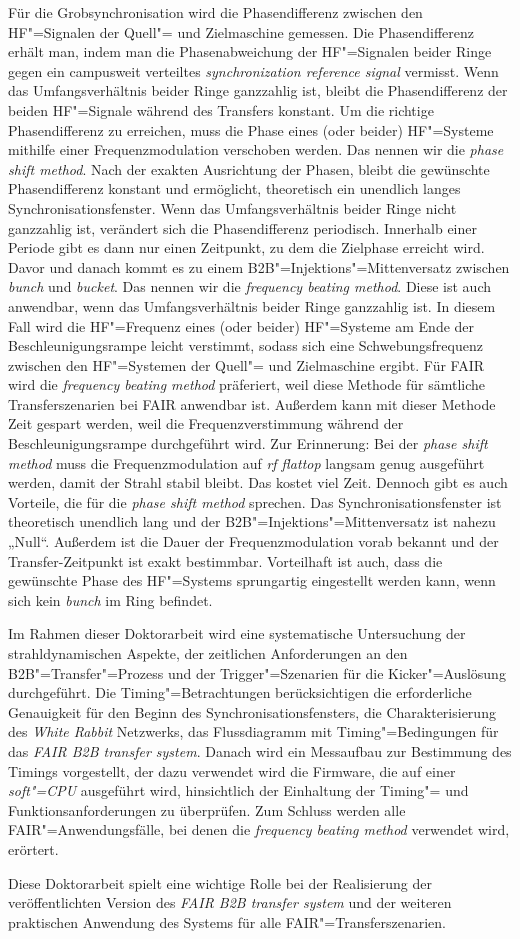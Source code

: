 F\"ur die Grobsynchronisation wird die Phasendifferenz zwischen den HF"=Signalen der Quell"= und Zielmaschine gemessen. Die Phasendifferenz erhält man, indem man die Phasenabweichung der HF"=Signalen beider Ringe gegen ein campusweit verteiltes \textit{synchronization reference signal} vermisst. Wenn das Umfangsverh\"altnis  beider Ringe ganzzahlig ist, bleibt die Phasendifferenz der beiden HF"=Signale w\"ahrend des Transfers konstant. Um die richtige Phasendifferenz zu erreichen, muss die Phase eines (oder beider) HF"=Systeme mithilfe einer Frequenzmodulation verschoben werden. Das nennen wir die \textit{phase shift method}. Nach der exakten Ausrichtung der Phasen, bleibt die gew\"unschte Phasendifferenz konstant und erm\"oglicht, theoretisch ein unendlich langes Synchronisationsfenster. Wenn das Umfangsverh\"altnis beider Ringe nicht ganzzahlig ist, ver\"andert sich die Phasendifferenz periodisch. Innerhalb einer Periode gibt es dann nur einen Zeitpunkt, zu dem die Zielphase erreicht wird. Davor und danach kommt es zu einem B2B"=Injektions"=Mittenversatz zwischen \textit{bunch} und \textit{bucket}. Das nennen wir die \textit{frequency beating method}. Diese ist auch anwendbar, wenn das Umfangsverh\"altnis beider Ringe ganzzahlig ist. In diesem Fall wird die HF"=Frequenz eines (oder beider) HF"=Systeme am Ende der Beschleunigungsrampe leicht verstimmt, sodass sich eine Schwebungsfrequenz zwischen den HF"=Systemen der Quell"= und Zielmaschine ergibt. F\"ur FAIR wird die \textit{frequency beating method} pr\"aferiert, weil diese Methode f\"ur s\"amtliche Transferszenarien bei FAIR anwendbar ist. Au\ss{}erdem kann mit dieser Methode Zeit gespart werden, weil die Frequenzverstimmung w\"ahrend der Beschleunigungsrampe durchgef\"uhrt wird. Zur Erinnerung: Bei der \textit{phase shift method} muss die Frequenzmodulation auf \textit{rf flattop} langsam genug ausgef\"uhrt werden, damit der Strahl stabil bleibt. Das kostet viel Zeit.  Dennoch gibt es auch Vorteile, die f\"ur die \textit{phase shift method} sprechen. Das Synchronisationsfenster ist theoretisch unendlich lang und der B2B"=Injektions"=Mittenversatz ist nahezu „Null“. Au\ss{}erdem ist die Dauer der Frequenzmodulation vorab bekannt und der Transfer-Zeitpunkt ist exakt bestimmbar. Vorteilhaft ist auch, dass die gew\"unschte Phase des HF"=Systems  sprungartig eingestellt werden kann, wenn sich kein \textit{bunch} im Ring befindet.

Im Rahmen dieser Doktorarbeit wird eine systematische Untersuchung der strahldynamischen Aspekte, der zeitlichen Anforderungen an den B2B"=Transfer"=Prozess und der Trigger"=Szenarien f\"ur die Kicker"=Ausl\"osung durchgef\"uhrt. Die Timing"=Betrachtungen ber\"ucksichtigen die erforderliche Genauigkeit f\"ur den Beginn des Synchronisationsfensters, die Charakterisierung des \textit{White Rabbit} Netzwerks, das Flussdiagramm mit Timing"=Bedingungen f\"ur das \textit{FAIR B2B transfer system}. Danach wird ein Messaufbau zur Bestimmung des Timings vorgestellt, der dazu verwendet wird die Firmware, die auf einer \textit{soft"=CPU} ausgef\"uhrt wird, hinsichtlich der Einhaltung der Timing"= und Funktionsanforderungen zu \"uberpr\"ufen. Zum Schluss werden alle FAIR"=Anwendungsf\"alle, bei denen die \textit{frequency beating method} verwendet wird, er\"ortert.

Diese Doktorarbeit spielt eine wichtige Rolle bei der Realisierung der ver\"offentlichten Version des \textit{FAIR B2B transfer system} und der weiteren praktischen Anwendung des Systems f\"ur alle FAIR"=Transferszenarien.

